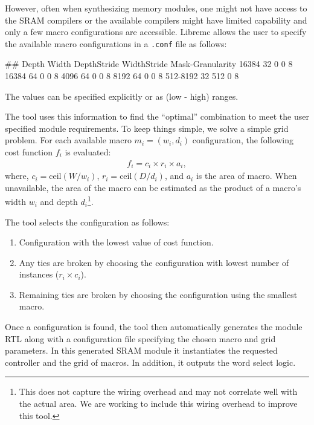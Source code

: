 However, often when synthesizing memory modules, one might not have access to the SRAM compilers or the available compilers might have limited capability and only a few macro configurations are accessible. Libremc allows the user to specify the available macro configurations in a \texttt{.conf} file as follows:

\begin{doccode}
\## Depth        Width   DepthStride  WidthStride  Mask-Granularity
16384          32      0            0            8
16384          64      0            0            8
4096           64      0            0            8
8192           64      0            0            8
512-8192       32      512          0            8
\end{doccode}
The values can be specified explicitly or as (low - high) ranges.  

The tool uses this information to find the ``optimal'' combination to meet the user specified module requirements. To keep things simple, we solve a simple grid problem. For each available macro \(m_i = (w_i, d_i)\) configuration, the following cost function \(f_i\) is evaluated:
\begin{align}
    f_i = c_i \times r_i \times a_i,
\end{align}
where, \(c_i = \mathrm{ceil}(W / w_i)\), \(r_i = \mathrm{ceil}(D / d_i)\), and \(a_i\) is the area of macro. When unavailable, the area of the macro can be estimated as the product of a macro's width \(w_i\) and depth 
\(d_i\)\footnote{This does not capture the wiring overhead and may not correlate well with the actual area. We are working to include this wiring overhead to improve this tool.}. 

The tool selects the configuration as follows:
\begin{enumerate}
    \item Configuration with the lowest value of cost function.
    \item Any ties are broken by choosing the configuration with lowest number of instances (\(r_i \times c_i\)).
    \item Remaining ties are broken by choosing the configuration using the smallest macro.
\end{enumerate}

Once a configuration is found, the tool then automatically generates the module RTL along with a configuration file specifying the chosen macro and grid parameters. In this generated SRAM module it instantiates the requested controller and the grid of macros. In addition, it outputs the word select logic.

